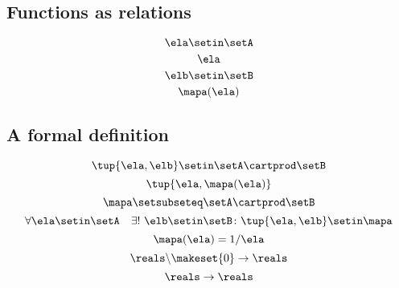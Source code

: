 \begin{forslides}
    \subsection{Functions as relations}

    \begin{equation}\label{eq:slides_session2_103}
        \ela \setin\setA
    \end{equation}
    \begin{equation}\label{eq:slides_session2_104}
        \ela
    \end{equation}
    \begin{equation}\label{eq:slides_session2_105}
        \elb \setin \setB
    \end{equation}
    \begin{equation}\label{eq:slides_session2_106}
        \mapa(\ela)
    \end{equation}

    \subsection{A formal definition}

    \begin{equation}\label{eq:slides_session2_107}
        \tup{\ela, \elb} \setin\setA \cartprod \setB
    \end{equation}
    \begin{equation}\label{eq:slides_session2_108}
        \tup{\ela, \mapa(\ela)}
    \end{equation}
    \begin{equation}\label{eq:slides_session2_109}
        \mapa \setsubseteq \setA \cartprod \setB
    \end{equation}
    \begin{equation}\label{eq:slides_session2_110}
        \forall \ela \setin\setA  \quad  \exists !
        \ \elb \setin\setB \colon \tup{\ela,\elb} \setin\mapa
    \end{equation}
    \begin{equation}\label{eq:slides_session2_111}
        \mapa(\ela) = 1/ \ela
    \end{equation}
    \begin{equation}\label{eq:slides_session2_112}
        \reals \backslash \makeset{ 0 } \to \reals
    \end{equation}
    \begin{equation}\label{eq:slides_session2_113}
        \reals \to \reals
    \end{equation}


\end{forslides}
